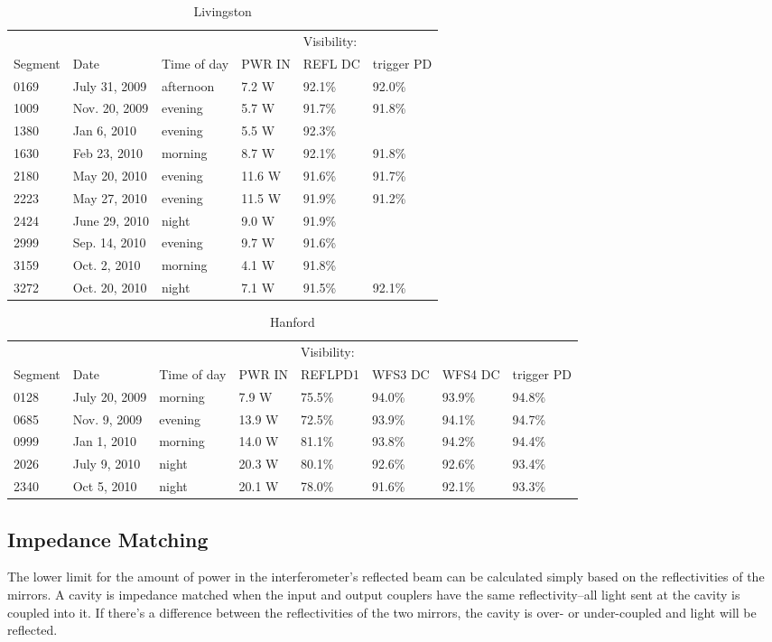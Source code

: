 \begin{table}
\centering
\begin{tabular}{l l l l l l}
 & & & & Visibility: & \\
Segment & Date & Time of day & PWR IN & REFL DC & trigger PD \\
\hline\hline
0169 & July 31, 2009 & afternoon & 7.2 W & 92.1\% & 92.0\% \\
1009 & Nov. 20, 2009 & evening & 5.7 W & 91.7\% & 91.8\% \\
1380 & Jan 6, 2010 & evening & 5.5 W & 92.3\% \\
1630 & Feb 23, 2010 & morning & 8.7 W & 92.1\% & 91.8\% \\
2180 & May 20, 2010 & evening & 11.6 W  & 91.6\% & 91.7\% \\
2223 & May 27, 2010 & evening & 11.5 W  & 91.9\% & 91.2\% \\
2424 & June 29, 2010 & night & 9.0 W & 91.9\% \\
2999 & Sep. 14, 2010 & evening & 9.7 W & 91.6\% \\
3159 & Oct. 2, 2010 & morning & 4.1 W & 91.8\%\\
3272 & Oct. 20, 2010 & night & 7.1 W & 91.5\% & 92.1\% \\
\hline
\end{tabular}
\caption{Livingston}
\label{table:llo_vis}
\end{table}

\begin{table}
\centering
\begin{tabular}{l l l l l l l l}
 & & & & Visibility: & & \\
Segment & Date & Time of day & PWR IN & REFLPD1 & WFS3 DC & WFS4 DC &
trigger PD\\
\hline\hline
0128 & July 20, 2009 & morning & 7.9 W & 75.5\% & 94.0\% & 93.9\% & 94.8\%\\
0685 & Nov. 9, 2009 & evening & 13.9 W & 72.5\% & 93.9\% & 94.1\% & 94.7\%\\
0999 & Jan 1, 2010 & morning & 14.0 W & 81.1\% & 93.8\% & 94.2\% & 94.4\%\\
2026 & July 9, 2010 & night & 20.3 W & 80.1\% & 92.6\% & 92.6\% & 93.4\% \\
2340 & Oct 5, 2010 & night & 20.1 W & 78.0\% & 91.6\% & 92.1\% & 93.3\%\\
\hline
\end{tabular}
\caption{Hanford}
\label{table:lho_mm}
\end{table}


\subsection{Impedance Matching}
\label{sec:impedance}
The lower limit for the amount of power in the interferometer's reflected beam 
can be calculated simply based on the reflectivities of the 
mirrors. A cavity is impedance matched when the input and output
couplers have the same reflectivity--all 
light sent at the cavity is coupled into it. If there's a difference between the reflectivities of the two 
mirrors, the cavity is over- or under-coupled and light will be reflected. 

